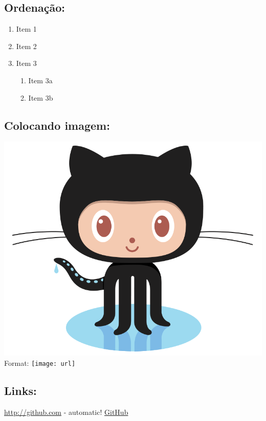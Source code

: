 \documentclass[]{article}
\providecommand{\tightlist}{%
  \setlength{\itemsep}{0pt}\setlength{\parskip}{0pt}}
\begin{document}
\subsection{Ordenação:}\label{ordenacao}

\begin{enumerate}
\def\labelenumi{\arabic{enumi}.}
\tightlist
\item
  Item 1
\item
  Item 2
\item
  Item 3

  \begin{enumerate}
  \def\labelenumii{\arabic{enumii}.}
  \tightlist
  \item
    Item 3a
  \item
    Item 3b
  \end{enumerate}
\end{enumerate}

\subsection{Colocando imagem:}\label{colocando-imagem}

\includegraphics{Octocat.png} Format: \texttt{[image: url]}

\subsection{Links:}\label{links}

\url{http://github.com} - automatic! \href{http://github.com}{GitHub}
\end{document}
